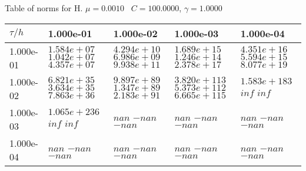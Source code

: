 \begin{center}
Table of norms for H. $\mu = 0.0010$ \, $C = 100.0000$, $\gamma = 1.0000$
  
\begin{tabular}{|p{1in}|p{1in}|p{1in}|p{1in}|p{1in}|} \hline
$\tau / h$ &1.000e-01 &1.000e-02 &1.000e-03 &1.000e-04 \\ \hline 
1.000e-01 & $1.584e+07$  $1.042e+07$  $4.357e+07$  & $4.294e+10$  $6.986e+09$  $9.938e+11$  & $1.689e+15$  $1.246e+14$  $2.378e+17$  & $4.351e+16$  $5.594e+15$  $8.077e+19$  \\ \hline 
1.000e-02 & $6.821e+35$  $3.634e+35$  $7.863e+36$  & $9.897e+89$  $1.347e+89$  $2.183e+91$  & $3.820e+113$  $5.373e+112$  $6.665e+115$  & $1.583e+183$  $inf$  $inf$  \\ \hline 
1.000e-03 & $1.065e+236$  $inf$  $inf$  & $nan$  $-nan$  $-nan$  & $nan$  $-nan$  $-nan$  & $nan$  $-nan$  $-nan$  \\ \hline 
1.000e-04 & $nan$  $-nan$  $-nan$  & $nan$  $-nan$  $-nan$  & $nan$  $-nan$  $-nan$  & $nan$  $-nan$  $-nan$  \\ \hline 

\end{tabular}\\[20pt]
\end{center}
